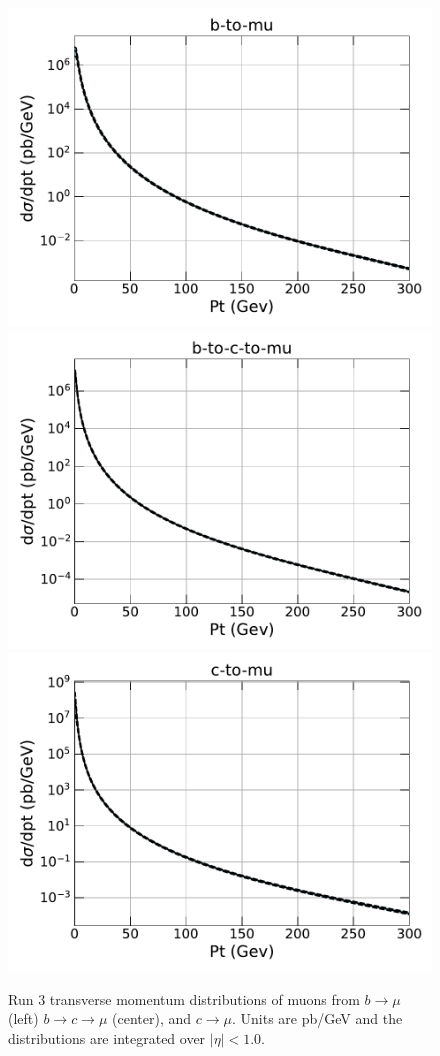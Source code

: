 \documentclass[12pt]{article}
\begin{document}
\begin{figure}[H]
\includegraphics[width=0.31\linewidth]{../muons/data/run3/b-to-mu.pdf}  
\includegraphics[width=0.31\linewidth]{../muons/data/run3/b-to-c-to-mu.pdf}  
\includegraphics[width=0.31\linewidth]{../muons/data/run3/c-to-mu.pdf}  
\caption{Run 3 transverse momentum distributions of muons from $b \to \mu$ (left)
  $b \to c \to \mu$ (center), and $c \to \mu$.
Units are pb/GeV and the 
distributions 
are integrated over $|\eta|<1.0$.}
  \label{fig:bmuon}
\end{figure}
\end{document}
